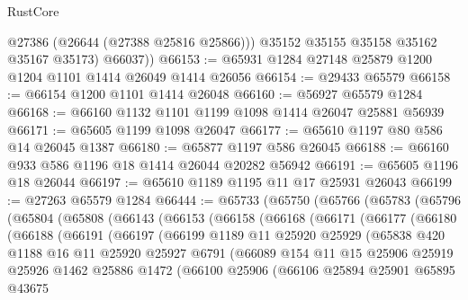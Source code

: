 \begin{lexlean}{RustCore}
\begin{coremodule}
            @27386
            (@26644 (@27388 @25816 @25866)))
          @35152
          @35155
          @35158
          @35162
          @35167
          @35173)
        @66037))
@66153 := @65931 @1284 @27148 @25879 @1200 @1204 @1101 @1414 @26049 @1414 @26056
@66154 := @29433 @65579
@66158 := @66154 @1200 @1101 @1414 @26048
@66160 := @56927 @65579 @1284
@66168 := @66160 @1132 @1101 @1199 @1098 @1414 @26047 @25881 @56939
@66171 := @65605 @1199 @1098 @26047
@66177 := @65610 @1197 @80 @586 @14 @26045 @1387
@66180 := @65877 @1197 @586 @26045
@66188 := @66160 @933 @586 @1196 @18 @1414 @26044 @20282 @56942
@66191 := @65605 @1196 @18 @26044
@66197 := @65610 @1189 @1195 @11 @17 @25931 @26043
@66199 := @27263 @65579 @1284
@66444 := @65733
    (@65750
      (@65766
        (@65783
          (@65796
            (@65804
              (@65808
                (@66143
                  (@66153
                    (@66158
                      (@66168
                        (@66171
                          (@66177
                            (@66180
                              (@66188
                                (@66191
                                  (@66197
                                    (@66199
                                      @1189
                                      @11
                                      @25920
                                      @25929
                                      (@65838
                                        @420
                                        @1188
                                        @16
                                        @11
                                        @25920
                                        @25927
                                        @6791
                                        (@66089
                                          @154
                                          @11
                                          @15
                                          @25906
                                          @25919
                                          @25926
                                          @1462
                                          @25886
                                          @1472
                                          (@66100
                                            @25906
                                            (@66106
                                              @25894
                                              @25901
                                              @65895
                                              @43675

\end{coremodule}
\end{lexlean}
